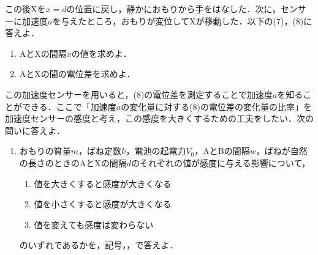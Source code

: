 この後Xを$x = d$の位置に戻し，静かにおもりから手をはなした．次に，センサーに加速度$a$を与えたところ，おもりが変位してXが移動した．以下の(7)，(8)に答えよ．
\begin{enumerate}[(1), resume]
  \item AとXの間隔$x$の値を求めよ．
  \item AとXの間の電位差を求めよ．
\end{enumerate}

この加速度センサーを用いると，(8)の電位差を測定することで加速度$a$を知ることができる．ここで「加速度$a$の変化量に対する(8)の電位差の変化量の比率」を加速度センサーの感度と考え，この感度を大きくするための工夫をしたい．次の問いに答えよ．
\begin{enumerate}[(1), resume]
  \item おもりの質量$m$，ばね定数$k$，電池の起電力$V_0$，AとBの間隔$w$，ばねが自然の長さのときのAとXの間隔$d$のそれぞれの値が感度に与える影響について，
    \begin{enumerate}[label=\mctext{\arabic*}]
      \item 値を大きくすると感度が大きくなる
      \item 値を小さくすると感度が大きくなる
      \item 値を変えても感度は変わらない
    \end{enumerate}

    のいずれであるかを，記号，，で答えよ．
\end{enumerate}




